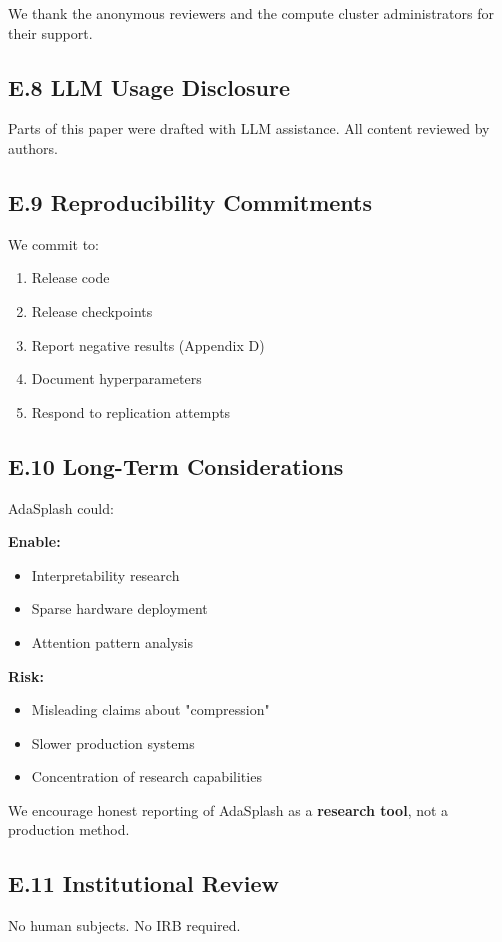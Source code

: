 We thank the anonymous reviewers and the compute cluster administrators for their support.

\subsection{E.8 LLM Usage Disclosure}

Parts of this paper were drafted with LLM assistance. All content reviewed 
by authors.

\subsection{E.9 Reproducibility Commitments}

We commit to:
\begin{enumerate}
\item Release code
\item Release checkpoints
\item Report negative results (Appendix D)
\item Document hyperparameters
\item Respond to replication attempts

\end{enumerate}
\subsection{E.10 Long-Term Considerations}

AdaSplash could:

\textbf{Enable:}
\begin{itemize}
\item Interpretability research
\item Sparse hardware deployment
\item Attention pattern analysis

\end{itemize}
\textbf{Risk:}
\begin{itemize}
\item Misleading claims about "compression"
\item Slower production systems
\item Concentration of research capabilities

\end{itemize}
We encourage honest reporting of AdaSplash as a \textbf{research tool}, not a 
production method.

\subsection{E.11 Institutional Review}

No human subjects. No IRB required.